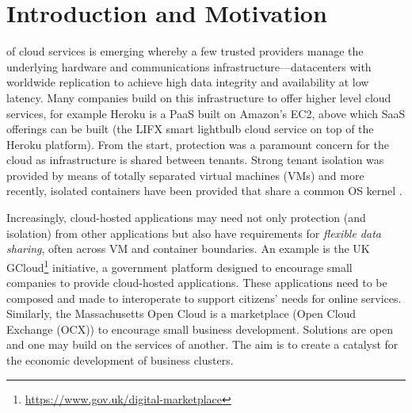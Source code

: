 \documentclass[10pt,journal,compsoc]{IEEEtran}
\begin{document}
\maketitle

\IEEEdisplaynotcompsoctitleabstractindextext





\IEEEpeerreviewmaketitle

\section{Introduction and Motivation}
\label{sec:introduction}



 of cloud services is emerging whereby a few trusted providers manage the underlying hardware and communications infrastructure---datacenters with worldwide replication to achieve high data integrity and availability at low latency. 
Many companies build on this infrastructure to offer higher level cloud services, for example Heroku is a PaaS built on Amazon's EC2, above which SaaS offerings can be built (\eg the LIFX smart lightbulb cloud service on top of the Heroku platform).
From the start, protection was a paramount concern for the cloud as infrastructure is shared between tenants. Strong tenant isolation was provided by means of totally separated virtual machines (VMs) \cite{barham2003a, kivity2007kvm}
and more recently, isolated containers have been provided that share a common OS kernel \cite{bernstein2014containers}.
 

Increasingly, cloud-hosted applications may need not only protection (and isolation) from other applications but also have requirements for \emph{flexible data sharing}, often across VM and container boundaries. 
An example is the UK GCloud\footnote{\url{https://www.gov.uk/digital-marketplace}} initiative, a government platform designed to encourage small companies to provide cloud-hosted applications. These applications need to be composed and made to interoperate to support citizens' needs for online services. 
Similarly, the Massachusetts Open Cloud \cite{DesnoyersIC2E2015} is a marketplace (Open Cloud Exchange (OCX)) to encourage small business development.
Solutions are open and one may build on the services of another. The aim is to create a catalyst for the economic development of business clusters. 
\end{document}
